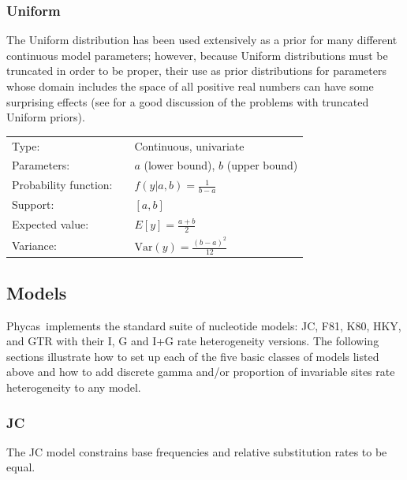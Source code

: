\documentclass[10pt]{article}
\newcommand{\Var}{\mbox{Var}}
\newcommand{\phycas}{{\sc Phycas}\index{Phycas}}
\begin{document}
\subsubsection{Uniform}

The Uniform distribution has been used extensively as a prior for many different continuous model parameters; however, because Uniform distributions must be truncated in order to be proper, their use as prior distributions for parameters whose domain includes the space of all positive real numbers can have some surprising effects (see \citet{Felsenstein2004} for a good discussion of the problems with truncated Uniform priors).

\begin{tabular}{lcl}
Type:                 & & Continuous, univariate \\
Parameters:           & & $a$ (lower bound), $b$ (upper bound)    \\
Probability function: & & $f(y|a,b) = \frac{1}{b-a}$ \\
Support:              & & $[a,b]$     \\
Expected value:       & & $E[y] = \frac{a + b}{2}$ \\
Variance:             & & $\Var(y) = \frac{(b - a)^2}{12}$ 
\end{tabular}

\subsection{Models}\label{subsection:models}

\phycas\ implements the standard suite of nucleotide models: JC, F81, K80, HKY, and GTR with their I, G and I+G rate heterogeneity versions. The following sections illustrate how to set up each of the five basic classes of models listed above and how to add discrete gamma and/or proportion of invariable sites rate heterogeneity to any model.

\subsubsection{JC}
The JC model \citep{JukesCantor1969} constrains base frequencies and relative substitution rates to be equal.
\end{document}
